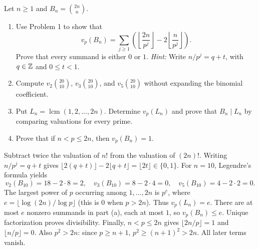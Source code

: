 Let $n\ge1$ and $B_n=\binom{2n}{n}$.
\begin{enumerate}
 \item Use Problem 1 to show that
 \[
 v_p(B_n)=\sum_{j\ge1}\left(
 \left\lfloor\frac{2n}{p^j}\right\rfloor
 -2\left\lfloor\frac{n}{p^j}\right\rfloor\right).
 \]
 Prove that every summand is either $0$ or $1$.
 \emph{Hint:} Write $n/p^j=q+t$, with $q\in\mathbb Z$ and $0\le t<1$.
 \item Compute $v_2\binom{20}{10}$, $v_3\binom{20}{10}$, and
 $v_5\binom{20}{10}$ without expanding the binomial coefficient.
 \item Put $L_n=\operatorname{lcm}(1,2,\ldots,2n)$. Determine $v_p(L_n)$
 and prove that $B_n\mid L_n$ by comparing valuations for every prime.
 \item Prove that if $n<p\le2n$, then $v_p(B_n)=1$.
\end{enumerate}
\begin{solution}
Subtract twice the valuation of $n!$ from the valuation of $(2n)!$.
Writing $n/p^j=q+t$ gives
$\lfloor2(q+t)\rfloor-2\lfloor q+t\rfloor=\lfloor2t\rfloor\in\{0,1\}$.
For $n=10$, Legendre's formula yields
\[
 v_2(B_{10})=18-2\cdot8=2,\quad
 v_3(B_{10})=8-2\cdot4=0,\quad
 v_5(B_{10})=4-2\cdot2=0.
\]
The largest power of $p$ occurring among $1,\ldots,2n$ is $p^e$, where
$e=\lfloor\log(2n)/\log p\rfloor$ (this is $0$ when $p>2n$).
Thus $v_p(L_n)=e$. There are at most $e$ nonzero summands in part (a),
each at most $1$, so $v_p(B_n)\le e$. Unique factorization proves divisibility.
Finally, $n<p\le2n$ gives $\lfloor2n/p\rfloor=1$ and
$\lfloor n/p\rfloor=0$. Also $p^2>2n$: since $p\ge n+1$,
$p^2\ge(n+1)^2>2n$. All later terms vanish.
\end{solution}

